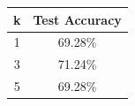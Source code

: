 \documentclass{article}
\begin{document}
\begin{probset}
\begin{progprob}
\begin{subprobset}
\begin{subprob}
        \begin{soln}
            \begin{center}
                \begin{tabular}{c|c}
                    k & Test Accuracy \\
                    \hline
                    1 & 69.28\% \\
                    3 & 71.24\% \\
                    5 & 69.28\% \\
                \end{tabular}
            \end{center}
        \end{soln}
    \end{subprob}
    \end{subprobset}
\end{progprob}
\end{probset}
\end{document}
